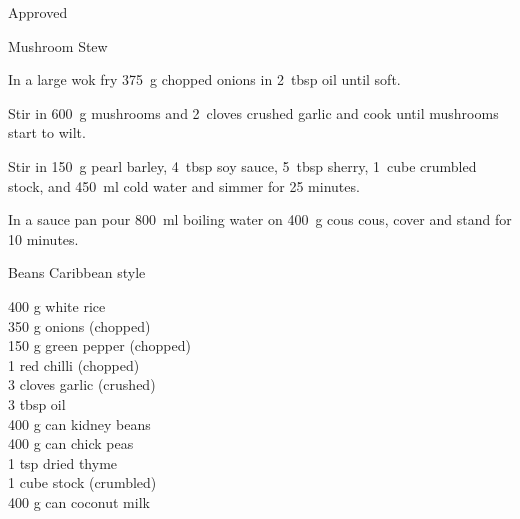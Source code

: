 \begin{menu}{Approved}
\begin{recipe}{2}{Mushroom Stew}
\begin{ingredients}
		\end{ingredients}
	
	
    \begin{instructions}
    \item 
        In a large wok fry
        375~g chopped onions
        in
        2~tbsp  oil
        until soft.
      \item 
        Stir in
        600~g  mushrooms
        and
        2~cloves crushed garlic
        and cook until mushrooms start to wilt.
      \item 
        Stir in
        150~g  pearl barley,
        4~tbsp  soy sauce,
        5~tbsp  sherry,
        1~cube crumbled stock,
        and
        450~ml  cold water
        and simmer for 25 minutes.
      \item 
      In a
      sauce pan pour 800~ml  boiling water
      on 400~g  cous cous, cover and
      stand for 10 minutes.
    
    \end{instructions}
    \end{recipe}%
  
    \begin{recipe}{2}{Beans Caribbean style}%
    
		\begin{ingredients}
		400 g white rice  \\
	350 g onions (chopped) \\
	150 g green pepper (chopped) \\
	1  red chilli (chopped) \\
	3 cloves garlic (crushed) \\
	3 tbsp oil  \\
	400 g can kidney beans  \\
	400 g can chick peas  \\
	1 tsp dried thyme  \\
	1 cube stock (crumbled) \\
	400 g can coconut milk  \\
	
		\end{ingredients}
	
	

\end{recipe}
\end{menu}

